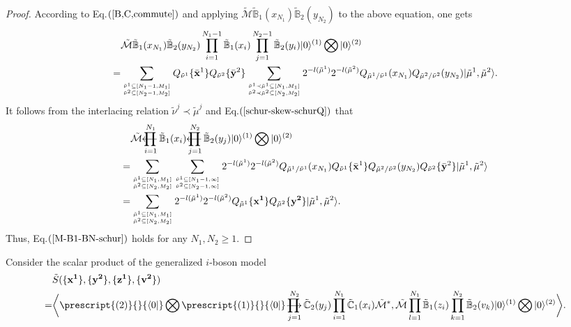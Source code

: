 \documentclass[11pt,reqno]{amsart}
\numberwithin{equation}{section}
\def\lprod{\mathop{\prod{\mkern-29.5mu}{\mathbf\longleftarrow}}}
\def\rprod{\mathop{\prod{\mkern-28.0mu}{\mathbf\longrightarrow}}}
\begin{document}
\begin{proof}
		According to   Eq.$(\ref{B,C,commute})$  and
		applying $\tilde{\mathcal{M}} \tilde{\mathbb{B}}_{1}(x_{N_1})\tilde{\mathbb{B}}_{2}(y_{N_2})$ to the above equation, one gets
		\begin{align}
			&\tilde{\mathcal{M}} \tilde{\mathbb{B}}_{1}(x_{N_1})\tilde{\mathbb{B}}_{2}(y_{N_2})
			\prod_{i=1}^{N_{1}-1} \tilde{\mathbb{B}}_{1}(x_i)
			\prod_{j=1}^{N_{2}-1} \tilde{\mathbb{B}}_{2}(y_i)	
			|0\rangle^{(1)}\bigotimes|0\rangle^{(2)}\notag\\
			=&\sum_{{ \tilde{\nu}^{1} \subseteq [N_{1}-1,M_1]}\atop{\tilde{\nu}^{2} \subseteq [N_{2}-1,M_2]}}
			Q_{\tilde{\nu}^{1}}\{\bar{\mathbf{x}}^1\}  Q_{\tilde{\nu}^{2}}\{ \bar{\mathbf{y}}^2 \} 	
			\sum_{{\tilde{\nu}^{1} \prec \tilde{\mu}^{1} \subseteq [N_1,M_1]}\atop{\tilde{\nu}^{2} \prec \tilde{\mu}^{2} \subseteq [N_2,M_2]}}
			2^{- l(\tilde{\mu}^{1})}	2^{- l(\tilde{\mu}^{2})}	
			Q_{\tilde{\mu}^{1}/\tilde{\nu}^{1}}(x_{N_1}) Q_{\tilde{\mu}^{2}/\tilde{\nu}^{2}}(y_{N_2}) 	
			| \tilde{\mu}^{1},\tilde{\mu}^{2} \rangle.
		\end{align}	
		It follows from the interlacing relation $\tilde{\nu}^{j} \prec \tilde{\mu}^{j}$ and Eq.$(\ref{schur-skew-schurQ})$ that
		\begin{align}
			&\tilde{\mathcal{M}}
			\lprod_{i=1}^{N_1} \tilde{\mathbb{B}}_{1}(x_i)
			\lprod_{j=1}^{N_2} \tilde{\mathbb{B}}_{2}(y_j)
			|0\rangle^{(1)}\bigotimes|0\rangle^{(2)}\notag\\
			= &	\sum_{{ \tilde{\mu}^{1} \subseteq [N_1,M_1]}\atop{\tilde{\mu}^{2} \subseteq [N_2,M_2]}}
			\sum_{{ \tilde{\nu}^{1} \subseteq [N_{1}-1,\infty]}\atop{\tilde{\nu}^{2} \subseteq [N_{2}-1,\infty]}}
			2^{- l(\tilde{\mu}^{1})}	2^{- l(\tilde{\mu}^{2})}	
			Q_{\tilde{\mu}^{1}/\tilde{\nu}^{1}}(x_{N_1}) 	Q_{\tilde{\nu}^{1}}\{\bar{\mathbf{x}}^1\}
			Q_{\tilde{\mu}^{2}/\tilde{\nu}^{2}}(y_{N_2}) 	Q_{\tilde{\nu}^{2}}\{ \bar{\mathbf{y}}^2 \}
			| \tilde{\mu}^{1},\tilde{\mu}^{2} \rangle \notag\\	
			= &\sum_{{ \tilde{\mu}^{1} \subseteq [N_1,M_1]}\atop{\tilde{\mu}^{2} \subseteq [N_2,M_2]}}
			2^{- l(\tilde{\mu}^{1})}	2^{- l(\tilde{\mu}^{2})}	
			Q_{\tilde{\mu}^{1}}\{\mathbf{x^1}\}  Q_{\tilde{\mu}^{2}}\{\mathbf{y^2}\}
			| \tilde{\mu}^{1},\tilde{\mu}^{2} \rangle.	
		\end{align}	
		Thus, Eq.$(\ref{M-B1-BN-schur})$ holds for any $N_{1},N_{2} \geq 1$.
	\end{proof}
	

Consider the scalar product of the   generalized $i$-boson model
\begin{align}
	&\tilde{S}(\{\mathbf{x^1}\}, \{\mathbf{y^2}\}, \{\mathbf{z^1}\}, \{\mathbf{v^2}\})\notag\\
	=&\bigg \langle \prescript{(2)}{}{\langle 0|}\bigotimes \prescript{(1)}{}{\langle 0|}
	\rprod_{j=1}^{N_2} \tilde{\mathbb{C}}_{2}(y_j)
	\prod_{i=1}^{N_1} \tilde{\mathbb{C}}_{1}(x_i) \tilde{\mathcal{M}}^*
	,\tilde{\mathcal{M}}\prod_{l=1}^{N_1} \tilde{\mathbb{B}}_{1}(z_i)
	\prod_{k=1}^{N_2} \tilde{\mathbb{B}}_{2}(v_k)
	|0\rangle^{(1)}\bigotimes|0\rangle^{(2)} \bigg\rangle.
\end{align}
	
\end{document}

